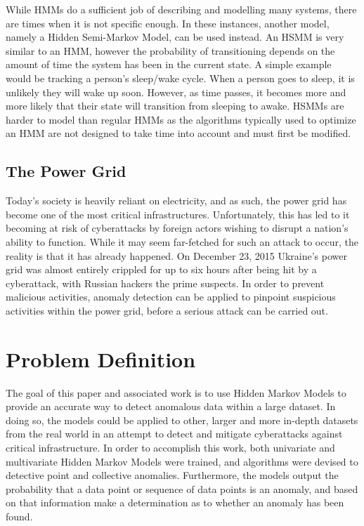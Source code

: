 \documentclass[letterpaper, 11pt]{article}%
\begin{document}
While HMMs do a sufficient job of describing and modelling many systems, there are times when it is not specific enough. In these instances, another model, namely a Hidden Semi-Markov Model, can be used instead. An HSMM is very similar to an HMM, however the probability of transitioning depends on the amount of time the system has been in the current state. A simple example would be tracking a person's sleep/wake cycle. When a person goes to sleep, it is unlikely they will wake up soon. However, as time passes, it becomes more and more likely that their state will transition from sleeping to awake. HSMMs are harder to model than regular HMMs as the algorithms typically used to optimize an HMM are not designed to take time into account and must first be modified. 

\subsection{The Power Grid}
Today's society is heavily reliant on electricity, and as such, the power grid has become one of the most critical infrastructures. Unfortunately, this has led to it becoming at risk of cyberattacks by foreign actors wishing to disrupt a nation's ability to function. While it may seem far-fetched for such an attack to occur, the reality is that it has already happened. On December 23, 2015 Ukraine's power grid was almost entirely crippled for up to six hours after being hit by a cyberattack, with Russian hackers the prime suspects\cite{ukraine}. In order to prevent malicious activities, anomaly detection can be applied to pinpoint suspicious activities within the power grid, before a serious attack can be carried out.

\section{Problem Definition}
The goal of this paper and associated work is to use Hidden Markov Models to provide an accurate way to detect anomalous data within a large dataset. In doing so, the models could be applied to other, larger and more in-depth datasets from the real world in an attempt to detect and mitigate cyberattacks against critical infrastructure. In order to accomplish this work, both univariate and multivariate Hidden Markov Models were trained, and algorithms were devised to detective point and collective anomalies. Furthermore, the models output the probability that a data point or sequence of data points is an anomaly, and based on that information make a determination as to whether an anomaly has been found. 
\end{document}
